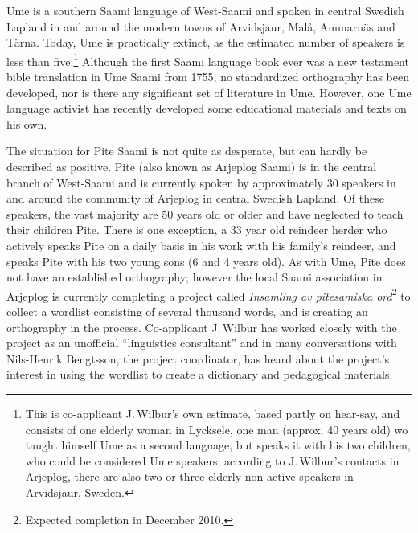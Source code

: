\documentclass[a4paper,12pt]{article}
\begin{document}
Ume is a southern Saami language of West-Saami and spoken in central Swedish Lapland in and around the modern towns of Arvidsjaur, Malå, Ammarnäs and Tärna. Today, Ume is practically extinct, as the estimated number of speakers is less than five.\footnote{This is co-applicant J.\,Wilbur's own estimate, based partly on hear-say, and consists of one elderly woman in Lycksele, one man (approx. 40 years old) wo taught himself Ume as a second language, but speaks it with his two children, who could be considered Ume speakers; according to J.\,Wilbur's contacts in Arjeplog, there are also two or three elderly non-active speakers in Arvidsjaur, Sweden.} Although the first Saami language book ever was a new testament bible translation in Ume Saami from 1755, no standardized orthography has been developed, nor is there any significant set of literature in Ume. However, one Ume language activist has recently developed some educational materials and texts on his own.

The situation for Pite Saami is not quite as desperate, but can hardly be described as positive. Pite (also known as Arjeplog Saami) is in the central branch of West-Saami and is currently spoken by approximately 30 speakers in and around the community of Arjeplog in central Swedish Lapland. Of these speakers, the vast majority are 50 years old or older and have neglected to teach their children Pite. There is one exception, a 33 year old reindeer herder who actively speaks Pite on a daily basis in his work with his family's reindeer, and speaks Pite with his two young sons (6 and 4 years old). As with Ume, Pite does not have an established orthography; however the local Saami association in Arjeplog is currently completing a project called \textit{Insamling av pitesamiska ord}\footnote{Expected completion in December 2010.} to collect a wordlist consisting of several thousand words, and is creating an orthography in the process. Co-applicant J.\,Wilbur has worked closely with the project as an unofficial “linguistics consultant” and in many conversations with Nils-Henrik Bengtsson, the project coordinator, has heard about the project's interest in using the wordlist to create a dictionary and pedagogical materials.
\end{document}
